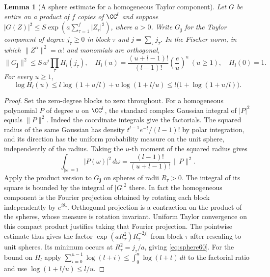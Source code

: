 \documentclass[a4paper,11pt]{article}
\newtheorem{lemma}[proposition]{Lemma}
\theoremstyle{definition}
\theoremstyle{remark}
\numberwithin{equation}{section}
\begin{document}
\begin{lemma}[A sphere estimate for a homogeneous Taylor component]\label{lem:sphere60}
Let \(G\) be entire on a product of \(f\) copies of \(\CC^l\)
and suppose \(|G(Z)|^2\le S\exp(a\sum_{\tau=1}^f|Z_\tau|^2)\),
where \(a>0\). Write \(G_{\boldsymbol j}\) for the Taylor
component of degree \(j_\tau\ge0\) in block \(\tau\) and
\(j=\sum_\tau j_\tau\). In the Fischer norm, in which
\(\|Z^\alpha\|^2=\alpha!\) and monomials are orthogonal,
\begin{equation}
   \|G_{\boldsymbol j}\|^2\le S\,a^j\prod_\tau H_l(j_\tau),
    \quad H_l(u)=\frac{(u+l-1)!}{(l-1)!}\left(\frac eu\right)^u
                       \ (u\ge1),\quad H_l(0)=1.           \label{eq:sphere60}
\end{equation}
For every \(u\ge1\),
\[
 \log H_l(u)\le l\log(1+u/l)+u\log(1+l/u)
                         \le l\big(1+\log(1+u/l)\big).
\]
\end{lemma}
\begin{proof}
Set the zero-degree blocks to zero throughout. For a homogeneous
polynomial \(P\) of degree \(u\) on \(\CC^l\), the standard
complex Gaussian integral of \(|P|^2\) equals \(\|P\|^2\).
Indeed the coordinate integrals give the factorials. The squared
radius of the same Gaussian has density
\(t^{l-1}e^{-t}/(l-1)!\) by polar integration, and its direction
has the uniform probability measure on the unit sphere, independently
of the radius. Taking the \(u\)-th moment of the squared radius gives
\[
       \int_{|\omega|=1}|P(\omega)|^2\,d\omega
                        =\frac{(l-1)!}{(u+l-1)!}\,\|P\|^2 .
\]
Apply the product version to \(G_{\boldsymbol j}\) on spheres of
radii \(R_\tau>0\). The integral of its square is bounded by the
integral of \(|G|^2\) there. In fact the homogeneous component
is the Fourier projection obtained by rotating each block
independently by \(e^{i\theta_\tau}\). Orthogonal projection is
a contraction on the product of the spheres, whose measure is
rotation invariant. Uniform Taylor convergence on this compact
product justifies taking that Fourier projection. The pointwise
estimate thus gives the factor
\(\exp(aR_\tau^2)R_\tau^{-2j_\tau}\) from block \(\tau\) after
rescaling to unit spheres. Its minimum occurs at
\(R_\tau^2=j_\tau/a\), giving \eqref{eq:sphere60}.
For the bound on \(H_l\) apply
\(\sum_{i=0}^{u-1}\log(l+i)\le\int_0^u\log(l+t)\,dt\)
to the factorial ratio and use \(\log(1+l/u)\le l/u\).
\end{proof}
\end{document}
